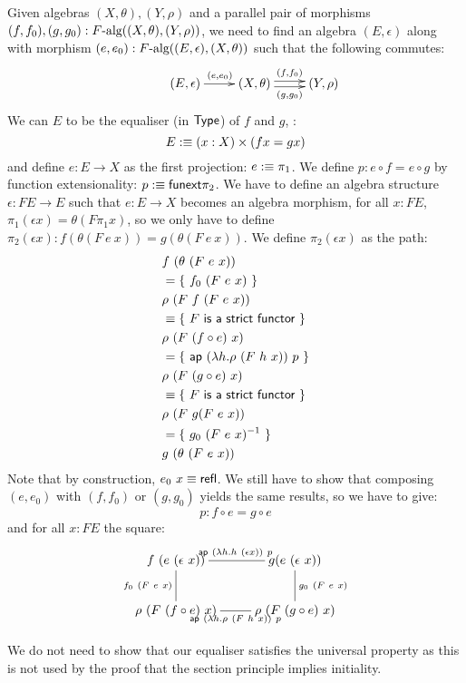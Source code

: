 \documentclass[a4paper,10pt]{report}
\begin{document}
Given algebras $(X,\theta), (Y,\rho)$ and a parallel pair of morphisms
$(f,f_0),(g,g_0) : F\mbox{-alg}((X,\theta),(Y,\rho))$, we need to find
an algebra $(E,\epsilon)$ along with morphism
$(e,e_0) : F\mbox{-alg}((E,\epsilon),(X,\theta))$ such that the
following commutes:
$$
\xymatrix{ &(E,\epsilon) \ar[r]^{(e,e_0)} &(X,\theta) \ar@<-.5ex>[r]_-{(g,g_0)}
  \ar@<.5ex>[r]^-{(f,f_0)} &(Y,\rho) }
$$
We can $E$ to be the equaliser (in $\mathsf{Type}$) of $f$ and $g$, \ie:
$$
E :\equiv (x : X) \times (f x = g x)
$$
and define $e : E \to X$ as the first projection: $e :\equiv \pi_1$.
We define $p : e \circ f = e \circ g$ by function extensionality:
$p :\equiv \mathsf{funext} \pi_2$. We have to define an algebra
structure $\epsilon : FE \to E$ such that $e : E \to X$ becomes an
algebra morphism, \ie for all $x : FE$,
$\pi_1 (\epsilon x) = \theta (F \pi_1 x)$, so we only have to define
$\pi_2 (\epsilon x) : f (\theta (F\ e\ x)) = g (\theta (F\ e\ x))$. We
define $\pi_2 (\epsilon x)$ as the path:
%
\begin{align*}
  &f\ (\theta\ (F\ e\ x)) \\
  &= \{\ f_0\ (F\ e\ x)\ \} \\
  &\rho\ (F\ f\ (F\ e\ x)) \\
  &\equiv \{\ \textsf{$F$ is a strict functor}\ \} \\
  &\rho\ (F\ (f \circ e)\ x) \\
  &= \{\ \mathsf{ap}\ (\lambda h . \rho\ (F\ h\ x))\ p\ \} \\
  &\rho\ (F\ (g \circ e)\ x) \\
  &\equiv \{\ \textsf{$F$ is a strict functor}\ \} \\
  &\rho\ (F\ g (F\ e\ x)) \\
  &= \{\ g_0\ (F\ e\ x)^{-1}\ \} \\
  &g\ (\theta\ (F\ e\ x))
\end{align*}
%
Note that by construction, $e_0\ x \equiv \operatorname{\mathsf{refl}}$. We still have to show
that composing $(e,e_0)$ with $(f,f_0)$ or $(g,g_0)$ yields the same
results, so we have to give:
$$
p : f \circ e = g \circ e
$$
and for all $x : FE$ the square:
$$
\xymatrix{
f\ (e\ (\epsilon\ x)) 
  \ar@{-}[r]^{\ap\ (\lambda h . h\ (\epsilon x))\ p} 
  \ar@{-}[d]_{f_0\ (F\ e\ x)}  
&g (e\ (\epsilon\ x)) 
  \ar@{-}[d]^{g_0\ (F\ e\ x)}
\\
\rho\ (F\ (f \circ e)\ x)
  \ar@{-}[r]_{\ap\ (\lambda h . \rho\ (F\ h\ x))\ p}
&\rho\ (F\ (g \circ e)\ x)}
$$

We do not need to show that our equaliser satisfies the universal
property as this is not used by the proof that the section principle
implies initiality.
\end{document}
